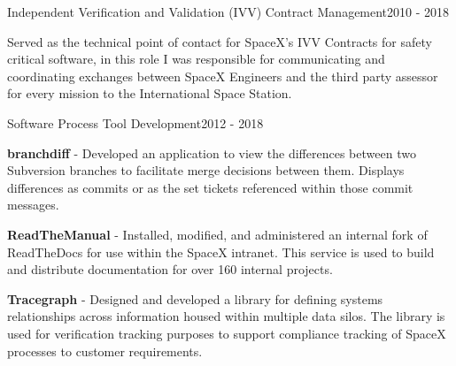 \begin{cventries}
  \cventry
  {Independent Verification and Validation (IVV) Contract Management}{}{}{2010 - 2018}
  {
    \begin{cvitems}
    \item Served as the technical point of contact for SpaceX's IVV Contracts for safety critical
      software, in this role I was responsible for communicating and coordinating exchanges between
      SpaceX Engineers and the third party assessor for every mission to the International Space
      Station.
    \end{cvitems}
  }


  \cventry
  {Software Process Tool Development}{}{}{2012 - 2018}
  {
    \begin{cvitems}
    \item \textbf{branchdiff} - Developed an application to view the differences between two
      Subversion branches to facilitate merge decisions between them. Displays differences as
      commits or as the set tickets referenced within those commit messages.
    \item \textbf{ReadTheManual} - Installed, modified, and administered an internal fork of
      ReadTheDocs for use within the SpaceX intranet. This service is used to build and distribute
      documentation for over 160 internal projects.
    \item \textbf{Tracegraph} - Designed and developed a library for defining systems relationships
      across information housed within multiple data silos. The library is used for verification
      tracking purposes to support compliance tracking of SpaceX processes to customer requirements.
    \end{cvitems}
  }



\end{cventries}
